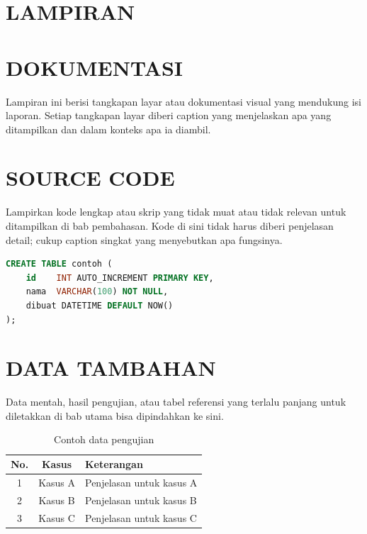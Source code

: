 \chapter*{LAMPIRAN}
\appendix
\inappendixtrue

\chapter{DOKUMENTASI}
Lampiran ini berisi tangkapan layar atau dokumentasi visual yang mendukung isi laporan. Setiap tangkapan layar diberi caption yang menjelaskan apa yang ditampilkan dan dalam konteks apa ia diambil.



\chapter{SOURCE CODE}
Lampirkan kode lengkap atau skrip yang tidak muat atau tidak relevan untuk ditampilkan di bab pembahasan. Kode di sini tidak harus diberi penjelasan detail; cukup caption singkat yang menyebutkan apa fungsinya.

\begin{lstlisting}[language=SQL, caption={Skrip lengkap pembuatan tabel}]
CREATE TABLE contoh (
    id    INT AUTO_INCREMENT PRIMARY KEY,
    nama  VARCHAR(100) NOT NULL,
    dibuat DATETIME DEFAULT NOW()
);
\end{lstlisting}

\chapter{DATA TAMBAHAN}
Data mentah, hasil pengujian, atau tabel referensi yang terlalu panjang untuk diletakkan di bab utama bisa dipindahkan ke sini.

\begin{table}[H]
    \centering
    \caption{Contoh data pengujian}
    \label{tab:data-lampiran}
    \begin{tabularx}{\textwidth}{| c | c | X |}
        \hline
        \textbf{No.} & \textbf{Kasus} & \textbf{Keterangan} \\ \hline
        1 & Kasus A & Penjelasan untuk kasus A \\ \hline
        2 & Kasus B & Penjelasan untuk kasus B \\ \hline
        3 & Kasus C & Penjelasan untuk kasus C \\ \hline
    \end{tabularx}
\end{table}
